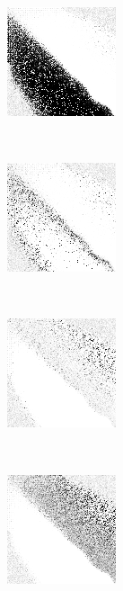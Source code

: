
\begin{figure}
\center

	\begin{subfigure}[t]{0.22\textwidth}
		\includegraphics[width=\stratgraphwidth]{images/findings/round2/strats/loser/hand_max_min.png}
		\caption{\handmaxmin}
	\end{subfigure}
	~
	\begin{subfigure}[t]{0.22\textwidth}
		\includegraphics[width=\stratgraphwidth]{images/findings/round2/strats/loser/hand_max_avg.png}
		\caption{\handmaxavg}
	\end{subfigure}
	~
	\begin{subfigure}[t]{0.22\textwidth}
		\includegraphics[width=\stratgraphwidth]{images/findings/round2/strats/loser/hand_max_med.png}
		\caption{\handmaxmed}
	\end{subfigure}
	~
	\begin{subfigure}[t]{0.22\textwidth}
		\includegraphics[width=\stratgraphwidth]{images/findings/round2/strats/loser/hand_max_poss.png}
		\caption{\handmaxposs}
	\end{subfigure}


\end{figure}
